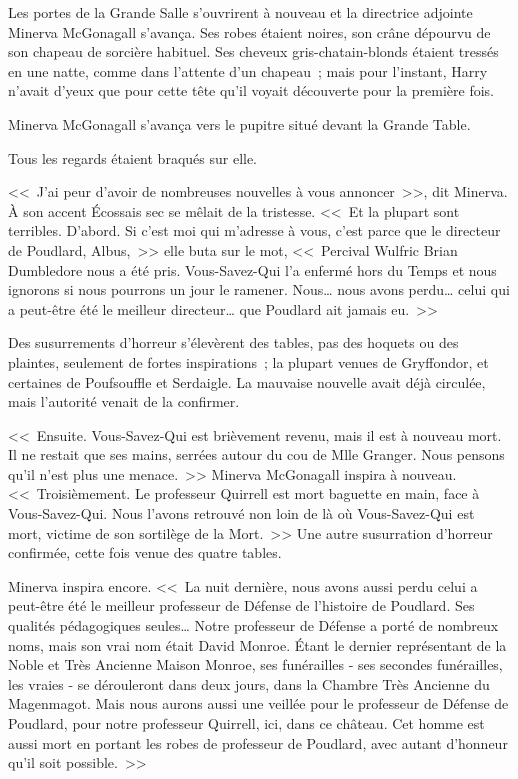 Les portes de la Grande Salle s'ouvrirent à nouveau et la directrice adjointe Minerva McGonagall s'avança. Ses robes étaient noires, son crâne dépourvu de son chapeau de sorcière habituel. Ses cheveux gris-chatain-blonds étaient tressés en une natte, comme dans l'attente d'un chapeau~; mais pour l'instant, Harry n'avait d'yeux que pour cette tête qu'il voyait découverte pour la première fois.

Minerva McGonagall s'avança vers le pupitre situé devant la Grande Table.

Tous les regards étaient braqués sur elle.

<<~J'ai peur d'avoir de nombreuses nouvelles à vous annoncer~>>, dit Minerva. À son accent Écossais sec se mêlait de la tristesse. <<~Et la plupart sont terribles. D'abord. Si c'est moi qui m'adresse à vous, c'est parce que le directeur de Poudlard, Albus,~>> elle buta sur le mot, <<~Percival Wulfric Brian Dumbledore nous a été pris. Vous-Savez-Qui l'a enfermé hors du Temps et nous ignorons si nous pourrons un jour le ramener. Nous… nous avons perdu… celui qui a peut-être été le meilleur directeur… que Poudlard ait jamais eu.~>>

Des susurrements d'horreur s'élevèrent des tables, pas des hoquets ou des plaintes, seulement de fortes inspirations~; la plupart venues de Gryffondor, et certaines de Poufsouffle et Serdaigle. La mauvaise nouvelle avait déjà circulée, mais l'autorité venait de la confirmer.

<<~Ensuite. Vous-Savez-Qui est brièvement revenu, mais il est à nouveau mort. Il ne restait que ses mains, serrées autour du cou de Mlle Granger. Nous pensons qu'il n'est plus une menace.~>> Minerva McGonagall inspira à nouveau. <<~Troisièmement. Le professeur Quirrell est mort baguette en main, face à Vous-Savez-Qui. Nous l'avons retrouvé non loin de là où Vous-Savez-Qui est mort, victime de son sortilège de la Mort.~>> Une autre susurration d'horreur confirmée, cette fois venue des quatre tables.

Minerva inspira encore. <<~La nuit dernière, nous avons aussi perdu celui a peut-être été le meilleur professeur de Défense de l'histoire de Poudlard. Ses qualités pédagogiques seules… Notre professeur de Défense a porté de nombreux noms, mais son vrai nom était David Monroe. Étant le dernier représentant de la Noble et Très Ancienne Maison Monroe, ses funérailles - ses secondes funérailles, les vraies - se dérouleront dans deux jours, dans la Chambre Très Ancienne du Magenmagot. Mais nous aurons aussi une veillée pour le professeur de Défense de Poudlard, pour notre professeur Quirrell, ici, dans ce château. Cet homme est aussi mort en portant les robes de professeur de Poudlard, avec autant d'honneur qu'il soit possible.~>>

